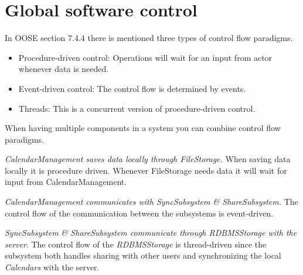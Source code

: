 \section{Global software control}

In OOSE section 7.4.4 there is mentioned three types of control flow paradigms. 

\begin{itemize}
	\item Procedure-driven control: Operations will wait for an input from actor whenever data is needed. 
	\item Event-driven control: The control flow is determined by events.
	\item Threads: This is a concurrent version of procedure-driven control.
\end{itemize}

 When having multiple components in a system you can combine control flow paradigms.
 
 \emph{CalendarManagement saves data locally through FileStorage.} When saving data locally it is procedure driven. Whenever FileStorage needs data it will wait for input from CalendarManagement.
 
 \emph{CalendarManagement communicates with SyncSubsystem \& ShareSubsystem.} The control flow of the communication between the subsystems is event-driven.
 
 \emph{SyncSubsystem \& ShareSubsystem communicate through RDBMSStorage with the server}. The control flow of the \textit{RDBMSStorage} is thread-driven since the subsystem both handles sharing with other users and synchronizing the local \textit{Calendars} with the server. 